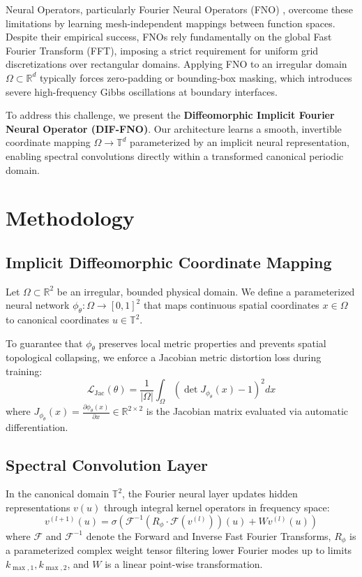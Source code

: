 \documentclass[journal]{IEEEtran}
\begin{document}
Neural Operators, particularly Fourier Neural Operators (FNO) \cite{li2021fourier}, overcome these limitations by learning mesh-independent mappings between function spaces. Despite their empirical success, FNOs rely fundamentally on the global Fast Fourier Transform (FFT), imposing a strict requirement for uniform grid discretizations over rectangular domains. Applying FNO to an irregular domain $\Omega \subset \mathbb{R}^d$ typically forces zero-padding or bounding-box masking, which introduces severe high-frequency Gibbs oscillations at boundary interfaces.

To address this challenge, we present the \textbf{Diffeomorphic Implicit Fourier Neural Operator (DIF-FNO)}. Our architecture learns a smooth, invertible coordinate mapping $\Omega \rightarrow \mathbb{T}^d$ parameterized by an implicit neural representation, enabling spectral convolutions directly within a transformed canonical periodic domain.

\section{Methodology}

\subsection{Implicit Diffeomorphic Coordinate Mapping}
Let $\Omega \subset \mathbb{R}^2$ be an irregular, bounded physical domain. We define a parameterized neural network $\phi_\theta: \Omega \rightarrow [0, 1]^2$ that maps continuous spatial coordinates $x \in \Omega$ to canonical coordinates $u \in \mathbb{T}^2$.

To guarantee that $\phi_\theta$ preserves local metric properties and prevents spatial topological collapsing, we enforce a Jacobian metric distortion loss during training:
\begin{equation}
\mathcal{L}_{\text{Jac}}(\theta) = \frac{1}{|\Omega|} \int_{\Omega} \left( \det J_{\phi_\theta}(x) - 1 \right)^2 dx
\end{equation}
where $J_{\phi_\theta}(x) = \frac{\partial \phi_\theta(x)}{\partial x} \in \mathbb{R}^{2 \times 2}$ is the Jacobian matrix evaluated via automatic differentiation.

\subsection{Spectral Convolution Layer}
In the canonical domain $\mathbb{T}^2$, the Fourier neural layer updates hidden representations $v(u)$ through integral kernel operators in frequency space:
\begin{equation}
v^{(l+1)}(u) = \sigma \left( \mathcal{F}^{-1} \left( R_\phi \cdot \mathcal{F}(v^{(l)}) \right)(u) + W v^{(l)}(u) \right)
\end{equation}
where $\mathcal{F}$ and $\mathcal{F}^{-1}$ denote the Forward and Inverse Fast Fourier Transforms, $R_\phi$ is a parameterized complex weight tensor filtering lower Fourier modes up to limits $k_{\max,1}, k_{\max,2}$, and $W$ is a linear point-wise transformation.
\end{document}
